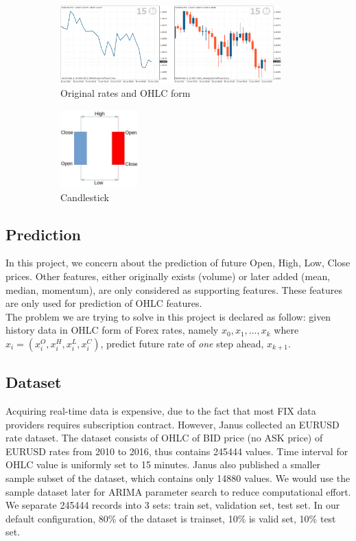 \documentclass[11pt]{article}
\begin{document}
\begin{figure}
    \begin{subfigure}[b]{0.5\textwidth}
      \includegraphics[height=3cm]{figs/ohlc.png}
      \caption{Original rates and OHLC form}
    \end{subfigure}
    \quad\quad\quad\quad\quad\quad\quad
    \begin{subfigure}[b]{0.2\textwidth}
      \includegraphics[height=3cm]{figs/candle.png}
      \caption{Candlestick}
    \end{subfigure}
    \caption{}
\end{figure}

\subsection{Prediction}
In this project, we concern about the prediction of future Open, High, Low,
Close prices. Other features, either originally exists (volume) or later added
(mean, median, momentum), are only considered as supporting features. These
features are only used for prediction of OHLC features.\\
The problem we are trying to solve in this project is declared as follow: given
history data in OHLC form of Forex rates, namely $x_0, x_1,\ldots,x_k$ where
$x_i=(x^O_i, x^H_i, x^L_i, x^C_i )$, predict future rate of \textit{one} step
ahead, $x_{k+1}$. 

\subsection{Dataset}
Acquiring real-time data is expensive, due to the fact that most FIX data
providers requires subscription contract. However, Janus \cite{meehau16eurusd}
collected an EURUSD rate dataset. The dataset consists of OHLC of BID price (no
ASK price) of EURUSD rates from 2010 to 2016, thus contains 245444 values. Time
interval for OHLC value is uniformly set to 15 minutes. Janus also published a
smaller sample subset of the dataset, which contains only 14880 values. We would
use the sample dataset later for ARIMA parameter search to reduce computational
effort.\\
We separate 245444 records into 3 sets: train set, validation set, test set. In
our default configuration, 80\% of the dataset is trainset, 10\% is valid set,
10\% test set.\\
\end{document}
